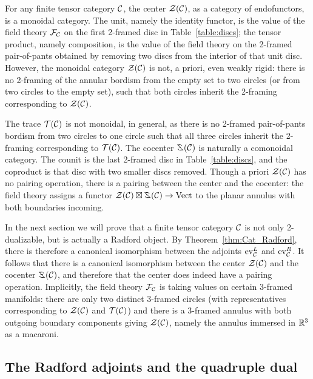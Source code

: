 \documentclass{amsart}
\begin{document}
\begin{remark}
For any finite tensor category $\mathcal C$, the center $\mathcal Z(\mathcal C)$, as a category of endofunctors, is a monoidal category.  The unit, namely the identity functor, is the value of the field theory $\mathcal F_\mathcal C$ on the first 2-framed disc in Table~\ref{table:discs}; the tensor product, namely composition, is the value of the field theory on the 2-framed pair-of-pants obtained by removing two discs from the interior of that unit disc.  However, the monoidal category $\mathcal Z(\mathcal C)$ is not, a priori, even weakly rigid: there is no 2-framing of the annular bordism from the empty set to two circles (or from two circles to the empty set), such that both circles inherit the 2-framing corresponding to $\mathcal Z(\mathcal C)$.  

The trace $\mathcal T(\mathcal C)$ is not monoidal, in general, as there is no 2-framed pair-of-pants bordism from two circles to one circle such that all three circles inherit the 2-framing corresponding to $\mathcal T(\mathcal C)$.  The cocenter $\coZ(\cC)$ is naturally a comonoidal category.  The counit is the last 2-framed disc in Table~\ref{table:discs}, and the coproduct is that disc with two smaller discs removed.  Though a priori $\mathcal Z(\mathcal C)$ has no pairing operation, there is a pairing between the center and the cocenter: the field theory assigns a functor $\cZ(\cC) \boxtimes \coZ(\cC) \ra \Vect$ to the planar annulus with both boundaries incoming.

In the next section we will prove that a finite tensor category $\mathcal C$ is not only 2-dualizable, but is actually a Radford object.  By Theorem~\ref{thm:Cat_Radford}, there is therefore a canonical isomorphism between the adjoints $\mathrm{ev}^L_\mathcal C$ and $\mathrm{ev}^R_\mathcal C$.  It follows that there is a canonical isomorphism between the center $\mathcal Z(\mathcal C)$ and the cocenter $\coZ(\cC)$, and therefore that the center does indeed have a pairing operation.  Implicitly, the field theory $\mathcal F_\mathcal C$ is taking values on certain 3-framed manifolds: there are only two distinct 3-framed circles (with representatives corresponding to $\mathcal Z(\mathcal C)$ and $\mathcal T(\mathcal C)$) and there is a 3-framed annulus with both outgoing boundary components giving $\mathcal Z(\mathcal C)$, namely the annulus immersed in $\mathbb R^3$ as a macaroni.
\end{remark}

\subsection{The Radford adjoints and the quadruple dual} \label{sec:radfordftc}
\end{document}
